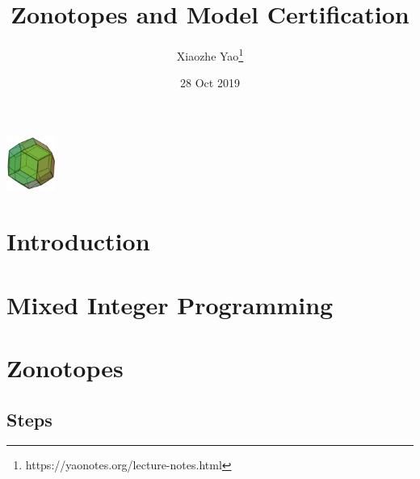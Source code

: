 \documentclass{article}
\title{Zonotopes and Model Certification}
\author{Xiaozhe Yao\footnote{https://yaonotes.org/lecture-notes.html}}
\date{28 Oct 2019}
\theoremstyle{definition}
\begin{document}
\maketitle
\begin{center}
    \includegraphics[width=60px]{Neural_Network/images/zonotope.pdf}
\end{center}

\section{Introduction}

\section{Mixed Integer Programming}

\section{Zonotopes}

\subsection{Steps}
\end{document}
